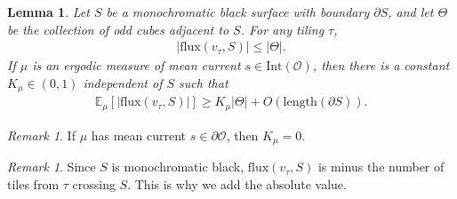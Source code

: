\documentclass[11pt]{article}
\newtheorem{lemma}[thm]{Lemma}
\theoremstyle{remark}
\newtheorem{rem}[thm]{Remark}
\theoremstyle{definition}
\newcommand{\mc}[1]{\mathcal{#1}}
\newcommand{\m}[1]{\mathbb{#1}}
\begin{document}
\begin{lemma}\label{lem: flow bound}
    Let $S$ be a monochromatic black surface with boundary $\partial S$, and let $\Theta$ be the collection of odd cubes adjacent to $S$. For any tiling $\tau$, 
    \begin{align*}
        |\text{flux}(v_\tau,S)| \leq |\Theta|.
    \end{align*}
    If $\mu$ is an ergodic measure of mean current $s\in\text{Int}(\mc O)$, then there is a constant $K_\mu\in (0,1)$ independent of $S$ such that
    \begin{align*}
        \m E_{\mu}[|\text{flux}(v_\tau,S)|] \geq K_\mu |\Theta| + O(\text{length}(\partial S)).
    \end{align*}
\end{lemma}
\begin{rem}
    If $\mu$ has mean current $s\in \partial \mc O$, then $K_\mu=0$. 
\end{rem}
\begin{rem}
    Since $S$ is monochromatic black, $\text{flux}(v_\tau,S)$ is minus the number of tiles from $\tau$ crossing $S$. This is why we add the absolute value.
\end{rem}
\end{document}
